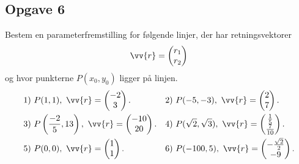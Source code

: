 \subsection*{Opgave 6}
Bestem en parameterfremstilling for følgende linjer, der har retningsvektorer $$\vv{r} = \begin{pmatrix}
r_1 \\ r_2
\end{pmatrix}$$ og hvor punkterne $P(x_0,y_0)$ ligger på linjen.
\begin{align*}
&1) \ P(1,1), \ \vv{r} = \begin{pmatrix}
-2 \\ 3
\end{pmatrix}.   &&2) \ P(-5,-3), \ \vv{r} = \begin{pmatrix}
2 \\ 7
\end{pmatrix}.    \\
&3) \ P\left(\frac{-2}{5},13\right), \ \vv{r} = \begin{pmatrix}
-10 \\ 20
\end{pmatrix}.   &&4) \ P(\sqrt{2},\sqrt{3}), \ \vv{r} = \begin{pmatrix}
\frac{1}{5} \\ \frac{7}{10}
\end{pmatrix}.   \\
&5) \ P(0,0), \ \vv{r} = \begin{pmatrix}
1 \\ 1
\end{pmatrix}.   &&6) \ P(-100,5), \ \vv{r} = \begin{pmatrix}
-\frac{\sqrt{2}}{2} \\ -9
\end{pmatrix}.   \\
\end{align*}

